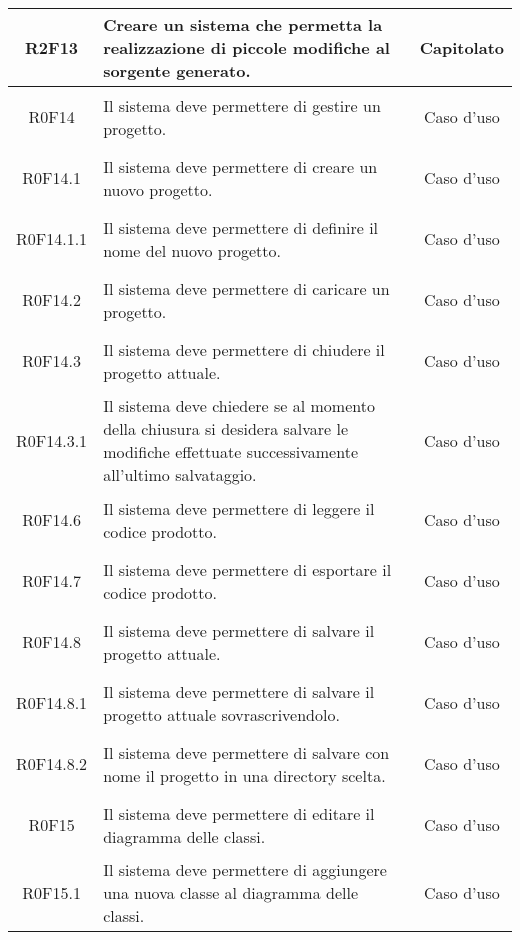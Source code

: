 \documentclass[../AnalisiDeiRequisiti.tex]{subfiles}
\begin{document}
\begin{longtable}{|c|>{\centering}p{7cm}|c|}
	\hypertarget{R2F13}{R2F13} & Creare un sistema che permetta la realizzazione di piccole modifiche al sorgente generato. & Capitolato \\ \hline
	\hypertarget{R0F14}{R0F14} & Il sistema deve permettere di gestire un progetto. & Caso d'uso \\ \hline
	\hypertarget{R0F14.1}{R0F14.1} & Il sistema deve permettere di creare un nuovo progetto. & Caso d'uso \\ \hline
	\hypertarget{R0F14.1.1}{R0F14.1.1} & Il sistema deve permettere di definire il nome del nuovo progetto. & Caso d'uso \\ \hline
	\hypertarget{R0F14.2}{R0F14.2} & Il sistema deve permettere di caricare un progetto.

& Caso d'uso \\ \hline
\hypertarget{R0F14.3}{R0F14.3} & Il sistema deve permettere di chiudere il progetto attuale. & Caso d'uso \\ \hline
\hypertarget{R0F14.3.1}{R0F14.3.1} & Il sistema deve chiedere se al momento della chiusura si desidera  salvare le modifiche effettuate successivamente all'ultimo salvataggio. & Caso d'uso \\ \hline
\hypertarget{R0F14.6}{R0F14.6} & Il sistema deve permettere di leggere il codice prodotto. & Caso d'uso \\ \hline
\hypertarget{R0F14.7}{R0F14.7} & Il sistema deve permettere di esportare il codice prodotto. & Caso d'uso \\ \hline
\hypertarget{R0F14.8}{R0F14.8} & Il sistema deve permettere di salvare il progetto attuale. & Caso d'uso \\ \hline
\hypertarget{R0F14.8.1}{R0F14.8.1} & Il sistema deve permettere di salvare il progetto attuale sovrascrivendolo. & Caso d'uso \\ \hline
\hypertarget{R0F14.8.2}{R0F14.8.2} & Il sistema deve permettere di salvare con nome il progetto in una directory scelta. & Caso d'uso \\ \hline
\hypertarget{R0F15}{R0F15} & Il sistema deve permettere di editare il diagramma delle classi. & Caso d'uso \\ \hline
\hypertarget{R0F15.1}{R0F15.1} & Il sistema deve permettere di aggiungere una nuova classe al diagramma delle classi. & Caso d'uso \\ \hline

\end{longtable}
\end{document}
